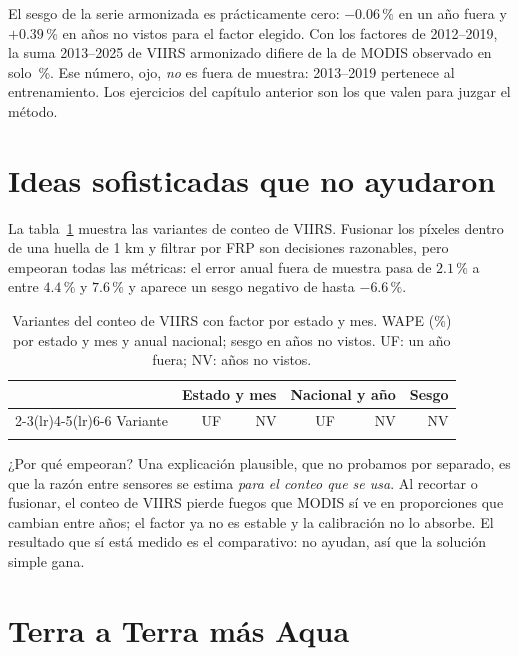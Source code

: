 El sesgo de la serie armonizada es prácticamente cero: $-0.06\,\%$ en un año fuera y $+0.39\,\%$ en años no vistos para el factor elegido. Con los factores de 2012--2019, la suma 2013--2025 de VIIRS armonizado difiere de la de MODIS observado en solo \difArm{}\,\%. Ese número, ojo, \emph{no} es fuera de muestra: 2013--2019 pertenece al entrenamiento. Los ejercicios del capítulo anterior son los que valen para juzgar el método.

\section{Ideas sofisticadas que no ayudaron}

La tabla~\ref{tab:variantes} muestra las variantes de conteo de VIIRS. Fusionar los píxeles dentro de una huella de 1 km y filtrar por FRP son decisiones razonables, pero empeoran todas las métricas: el error anual fuera de muestra pasa de $2.1\,\%$ a entre $4.4\,\%$ y $7.6\,\%$ y aparece un sesgo negativo de hasta $-6.6\,\%$.

\begin{table}[H]
\centering
\caption{Variantes del conteo de VIIRS con factor por estado y mes. WAPE (\%) por estado y mes y anual nacional; sesgo en años no vistos. UF: un año fuera; NV: años no vistos.}\label{tab:variantes}
\small
\begin{tabular}{@{}lrrrrr@{}}
\toprule
 & \multicolumn{2}{c}{Estado y mes} & \multicolumn{2}{c}{Nacional y año} & Sesgo \\
\cmidrule(lr){2-3}\cmidrule(lr){4-5}\cmidrule(lr){6-6}
Variante & UF & NV & UF & NV & NV \\
\midrule

\\
\bottomrule
\end{tabular}
\end{table}

¿Por qué empeoran? Una explicación plausible, que no probamos por separado, es que la razón entre sensores se estima \emph{para el conteo que se usa}. Al recortar o fusionar, el conteo de VIIRS pierde fuegos que MODIS sí ve en proporciones que cambian entre años; el factor ya no es estable y la calibración no lo absorbe. El resultado que sí está medido es el comparativo: no ayudan, así que la solución simple gana.

\section{Terra a Terra más Aqua}\label{sec:val-terra}

